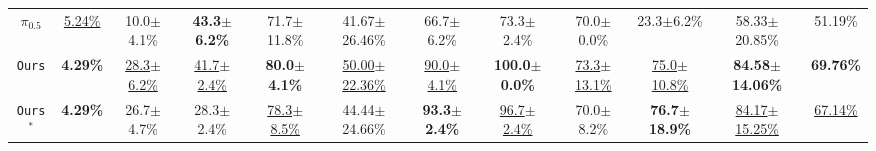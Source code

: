 \begin{table}[H]
\begin{adjustbox}{max width=\textwidth}
\begin{tabular}{cccccc|cccccc}
  $\pi_{0.5}$
  & \underline{5.24\%}
  & 10.0$\pm$4.1\%
  & \textbf{43.3$\pm$6.2\%}
  & 71.7$\pm$11.8\%
  & 41.67$\pm$26.46\%
  & 66.7$\pm$6.2\%
  & 73.3$\pm$2.4\%
  & 70.0$\pm$0.0\%
  & 23.3$\pm$6.2\%
  & 58.33$\pm$20.85\%   & 51.19\% \\

  \rowcolor{hclbrown!8!white}
  \texttt{Ours}
  & \textbf{4.29\%}
  & \underline{28.3$\pm$6.2\%}
  & \underline{41.7$\pm$2.4\%}
  & \textbf{80.0$\pm$4.1\%}
  & \underline{50.00$\pm$22.36\%}
  & \underline{90.0$\pm$4.1\%}
  & \textbf{100.0$\pm$0.0\%}
  & \underline{73.3$\pm$13.1\%}
  & \underline{75.0$\pm$10.8\%}
  & \textbf{84.58$\pm$14.06\%}   & \textbf{69.76\%} \\


  \rowcolor{hclbrown!15!white}
  \texttt{Ours}$^{*}$
  & \textbf{4.29\%}
  & 26.7$\pm$4.7\%
  & 28.3$\pm$2.4\%
  & \underline{78.3$\pm$8.5\%}
  & 44.44$\pm$24.66\%
  & \textbf{93.3$\pm$2.4\%}
  & \underline{96.7$\pm$2.4\%}
  & 70.0$\pm$8.2\%
  & \textbf{76.7$\pm$18.9\%}
  & \underline{84.17$\pm$15.25\%}   & \underline{67.14\%} \\

  \bottomrule
  \end{tabular}
  \end{adjustbox}
\end{table}

